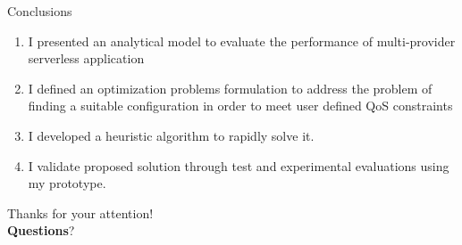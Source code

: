 \documentclass[13.5pt]{beamer}
\newcommand{\B}[1]{\textcolor{TorVergataColor}{\textbf{#1}}}
\begin{document}

\begin{frame}{Conclusions}

\begin{enumerate}
	
	\item I presented an analytical model to evaluate the performance of multi-provider serverless application 
	\vspace{\baselineskip}
	\item I defined an optimization problems formulation to address the problem of finding a suitable configuration in order to meet user defined QoS constraints
	\vspace{\baselineskip}
	\item I developed a heuristic algorithm to rapidly solve it.
	\vspace{\baselineskip}
	\item I validate proposed solution through test and experimental evaluations using my prototype.	
\end{enumerate}
\end{frame}


\begin{frame}{{}}
	\begin{block}{}
		\centering
		Thanks for your attention!\\\B{Questions}?
	\end{block}
\end{frame} 
\end{document}
